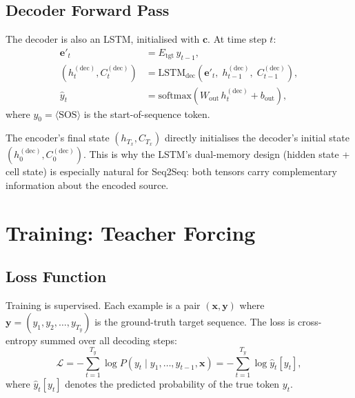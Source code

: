 \documentclass[12pt,a4paper]{article}
\begin{document}
\subsection{Decoder Forward Pass}

The decoder is also an LSTM, initialised with $\mathbf{c}$. At time step $t$:
\begin{align}
  \mathbf{e}'_t &= E_{\text{tgt}}\,y_{t-1}, \label{eq:tgt_embed}\\
  (h_t^{(\text{dec})}, C_t^{(\text{dec})}) &= \text{LSTM}_{\text{dec}}\!\left(\mathbf{e}'_t,\; h_{t-1}^{(\text{dec})},\; C_{t-1}^{(\text{dec})}\right), \label{eq:dec_step}\\
  \hat{y}_t &= \text{softmax}\!\left(W_{\text{out}}\,h_t^{(\text{dec})} + b_{\text{out}}\right), \label{eq:dec_output}
\end{align}
where $y_0 = \langle\text{SOS}\rangle$ is the start-of-sequence token.

\begin{keyinsight}
  The encoder's final state $(h_{T_x}, C_{T_x})$ directly initialises the decoder's initial
  state $(h_0^{(\text{dec})}, C_0^{(\text{dec})})$. This is why the LSTM's dual-memory design
  (hidden state + cell state) is especially natural for Seq2Seq: both tensors carry complementary
  information about the encoded source.
\end{keyinsight}

\section{Training: Teacher Forcing}
\label{sec:training}

\subsection{Loss Function}

Training is supervised. Each example is a pair $(\mathbf{x}, \mathbf{y})$ where $\mathbf{y} =
(y_1, y_2, \ldots, y_{T_y})$ is the ground-truth target sequence. The loss is cross-entropy
summed over all decoding steps:
\begin{equation}
  \mathcal{L} = -\sum_{t=1}^{T_y} \log P\!\left(y_t \mid y_1, \ldots, y_{t-1}, \mathbf{x}\right)
              = -\sum_{t=1}^{T_y} \log \hat{y}_t[y_t],
  \label{eq:seq2seq_loss}
\end{equation}
where $\hat{y}_t[y_t]$ denotes the predicted probability of the true token $y_t$.
\end{document}
